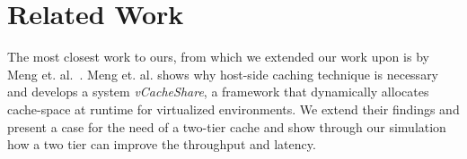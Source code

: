 \section{Related Work}

The most closest work to ours, from which we extended our work upon is by Meng et. al.~\cite{meng_vcacheshare:_2014}. Meng et. al. shows why host-side caching technique is necessary and develops a system \emph{vCacheShare}, a framework that dynamically allocates cache-space at runtime for virtualized environments. We extend their findings and present a case for the need of a two-tier cache and show through our simulation how a two tier can improve the throughput and latency.
